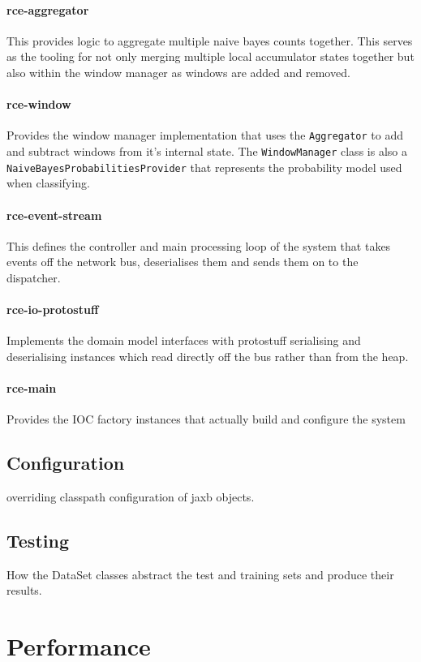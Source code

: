 \documentclass[a4paper,11pt]{scrreprt}
\begin{document}
\subsubsection{rce-aggregator}
This provides logic to aggregate multiple naive bayes counts together. This serves as the tooling for not only merging multiple local accumulator states together but also within the window manager as windows are added and removed.

\subsubsection{rce-window}
Provides the window manager implementation that uses the \verb|Aggregator| to add and subtract windows from it's internal state. The \verb|WindowManager| class is also a\\ \verb|NaiveBayesProbabilitiesProvider| that represents the probability model used when classifying.

\subsubsection{rce-event-stream}
This defines the controller and main processing loop of the system that takes events off the network bus, deserialises them and sends them on to the dispatcher.

\subsubsection{rce-io-protostuff}
Implements the domain model interfaces with protostuff serialising and deserialising instances which read directly off the bus rather than from the heap.

\subsubsection{rce-main}
Provides the IOC factory instances that actually build and configure the system 

\section{Configuration}
overriding classpath configuration of jaxb objects.
\section{Testing}
How the DataSet classes abstract the test and training sets and produce their results.
\chapter{Performance}
\end{document}
